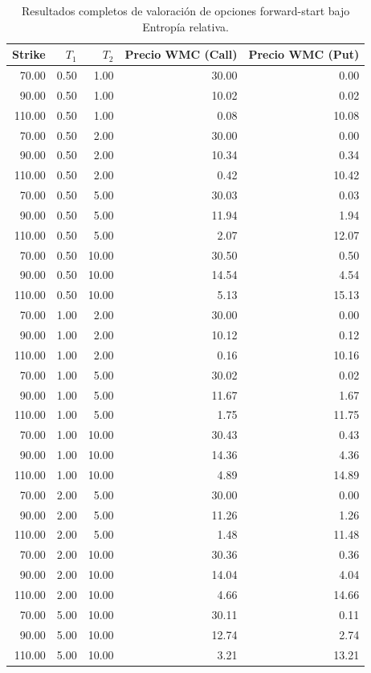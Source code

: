\begin{table}[H]
\centering
\caption{Resultados completos de valoración de opciones forward-start bajo Entropía relativa.}
\label{tab:forward_start_mre}
\scriptsize
\renewcommand{\arraystretch}{0.84}
\begin{tabular}{@{}rrrrr@{}}
\toprule
\textbf{Strike} & \textbf{\(T_1\)} & \textbf{\(T_2\)} & \textbf{Precio WMC (Call)} & \textbf{Precio WMC (Put)} \\
\midrule
70.00  & 0.50 & 1.00  & 30.00 & 0.00  \\
90.00  & 0.50 & 1.00  & 10.02 & 0.02  \\
110.00 & 0.50 & 1.00  & 0.08  & 10.08 \\
70.00  & 0.50 & 2.00  & 30.00 & 0.00  \\
90.00  & 0.50 & 2.00  & 10.34 & 0.34  \\
110.00 & 0.50 & 2.00  & 0.42  & 10.42 \\
70.00  & 0.50 & 5.00  & 30.03 & 0.03  \\
90.00  & 0.50 & 5.00  & 11.94 & 1.94  \\
110.00 & 0.50 & 5.00  & 2.07  & 12.07 \\
70.00  & 0.50 & 10.00 & 30.50 & 0.50  \\
90.00  & 0.50 & 10.00 & 14.54 & 4.54  \\
110.00 & 0.50 & 10.00 & 5.13  & 15.13 \\
70.00  & 1.00 & 2.00  & 30.00 & 0.00  \\
90.00  & 1.00 & 2.00  & 10.12 & 0.12  \\
110.00 & 1.00 & 2.00  & 0.16  & 10.16 \\
70.00  & 1.00 & 5.00  & 30.02 & 0.02  \\
90.00  & 1.00 & 5.00  & 11.67 & 1.67  \\
110.00 & 1.00 & 5.00  & 1.75  & 11.75 \\
70.00  & 1.00 & 10.00 & 30.43 & 0.43  \\
90.00  & 1.00 & 10.00 & 14.36 & 4.36  \\
110.00 & 1.00 & 10.00 & 4.89  & 14.89 \\
70.00  & 2.00 & 5.00  & 30.00 & 0.00  \\
90.00  & 2.00 & 5.00  & 11.26 & 1.26  \\
110.00 & 2.00 & 5.00  & 1.48  & 11.48 \\
70.00  & 2.00 & 10.00 & 30.36 & 0.36  \\
90.00  & 2.00 & 10.00 & 14.04 & 4.04  \\
110.00 & 2.00 & 10.00 & 4.66  & 14.66 \\
70.00  & 5.00 & 10.00 & 30.11 & 0.11  \\
90.00  & 5.00 & 10.00 & 12.74 & 2.74  \\
110.00 & 5.00 & 10.00 & 3.21  & 13.21 \\
\bottomrule
\end{tabular}
\end{table}
